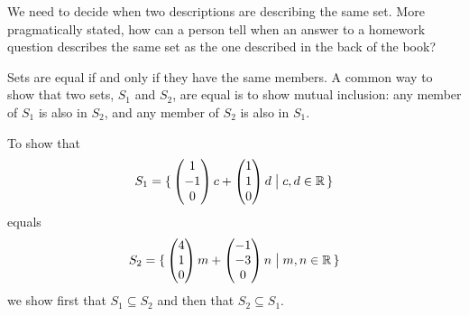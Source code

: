 We need to decide when two descriptions are describing the same set.
More pragmatically stated,
how can a person tell when an answer to a homework question describes
the same set as the one described in the back of the book?

Sets are equal if and only if they have the same members.
A common way to show that two sets, $S_1$ and $S_2$, are equal is to show 
mutual inclusion:
any member of $S_1$ is also in $S_2$, and 
any member of $S_2$ is also in $S_1$.

\begin{example}
To show that 
\begin{equation*}
  S_1=
  \mbox{$\{\,\begin{pmatrix} 1 \\ -1 \\ 0 \end{pmatrix}c+\begin{pmatrix} 1 \\ 1 \\ 0 \end{pmatrix}d\bigm| c,d\in\mathbb{R}\,\}$}
\end{equation*}
equals
\begin{equation*}
  S_2=
  \mbox{$\{\,\begin{pmatrix} 4 \\ 1 \\ 0 \end{pmatrix}m+\begin{pmatrix} -1 \\ -3 \\ 0 \end{pmatrix}n\bigm| m,n\in\mathbb{R}\,\}$}
\end{equation*}
we show first that $S_1\subseteq S_2$ and then that $S_2\subseteq S_1$. 


\end{example}
